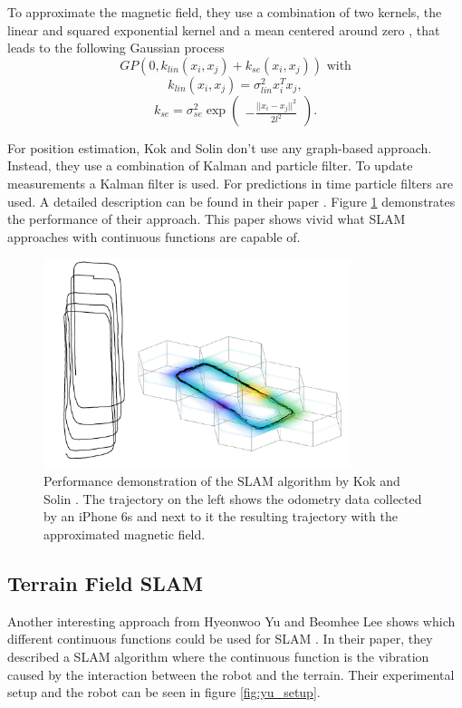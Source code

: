 To approximate the magnetic field, they use a combination of two kernels, the linear and squared exponential kernel and a mean centered around zero \cite{kok_scalable_2018}, that leads to the 
following Gaussian process
$$
GP(0, k_{lin}(x_i, x_j) + k_{se}(x_i, x_j)) \text{ with}
$$
$$
k_{lin}(x_i, x_j) = \sigma_{lin}^2 x_i^T x_j, 
$$
$$
k_{se} = \sigma_{se}^2 \exp 
\begin{pmatrix}
-\frac{||x_i - x_j||^2}{2l^2}
\end{pmatrix}\text{.}
$$

For position estimation, Kok and Solin don't use any graph-based approach. Instead, they use a combination of Kalman and particle filter. To update measurements a Kalman filter is used. For predictions in time particle filters are used. A detailed description can be found in their paper \cite{kok_scalable_2018}. Figure \ref{fig:kok_example} demonstrates the performance of their approach. This paper shows vivid what SLAM approaches with continuous functions are capable of.

\begin{figure}[h!]
	\centering
	\captionsetup{justification=centering,margin=1cm}
	\includegraphics[width=0.8\textwidth]{images/kok_example.png}
	\caption{
		Performance demonstration of the SLAM algorithm by Kok and Solin \cite{kok_scalable_2018}. The trajectory on the left shows the odometry data collected by an iPhone 6s and next to it the resulting trajectory with the approximated magnetic field.
	}
	\label{fig:kok_example}
\end{figure}

\newpage
\subsection{Terrain Field SLAM}
\label{sec:terrain_slam}
Another interesting approach from Hyeonwoo Yu and Beomhee Lee shows which different continuous functions could be used for SLAM \cite{yu_terrain_2018}. In their paper, they described a SLAM algorithm where the continuous function is the vibration caused by the interaction between the robot and the terrain. Their experimental setup and the robot can be seen in figure \ref{fig:yu_setup}.

